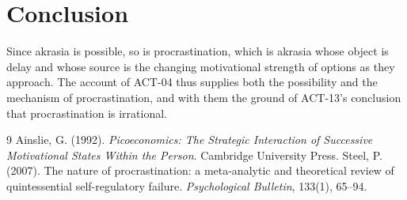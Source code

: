\documentclass{situationist-preprint}
\begin{document}
\section{Conclusion}

Since akrasia is possible, so is procrastination, which is akrasia whose object is delay and whose source is the changing motivational strength of options as they approach. The account of ACT-04 thus supplies both the possibility and the mechanism of procrastination, and with them the ground of ACT-13's conclusion that procrastination is irrational.

\begin{thebibliography}{9}
 Ainslie, G. (1992). \emph{Picoeconomics: The Strategic Interaction of Successive Motivational States Within the Person}. Cambridge University Press.
 Steel, P. (2007). The nature of procrastination: a meta-analytic and theoretical review of quintessential self-regulatory failure. \emph{Psychological Bulletin}, 133(1), 65--94.
\end{thebibliography}
\end{document}
